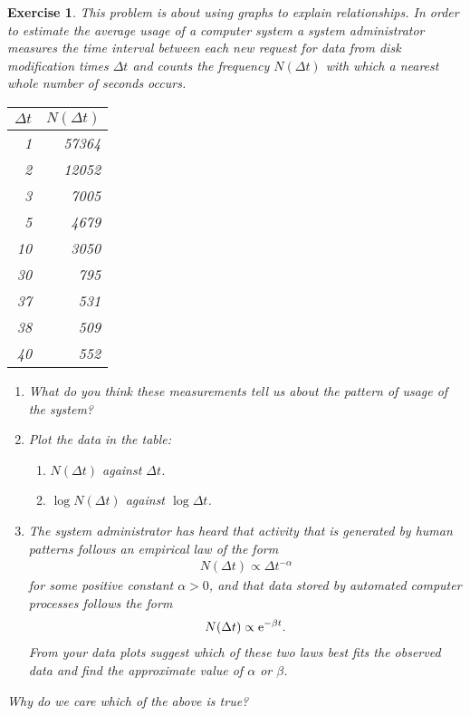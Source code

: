 \documentclass{book}
\newtheorem{exercise}{Exercise}
\def\beq{\begin{eqnarray}}
\def\eeq{\end{eqnarray}}
\def\e{{\rm e}}
\begin{document}
\begin{exercise}
This problem is about using graphs to explain relationships.
In order to estimate the average usage of a computer system a system
administrator measures the time interval between each new request for
data from disk modification times $\Delta t$ and counts the frequency
$N(\Delta t)$ with which a nearest whole number of seconds occurs.
\begin{center}
\begin{tabular}{r|r}
$\Delta t$ & $N(\Delta t)$\\
\hline
1  & 57364\\
2  & 12052\\
3  & 7005\\
5  & 4679\\
10 & 3050\\
30 & 795\\
37 & 531\\
38 & 509\\
40 & 552\\
\end{tabular}
\end{center} 
\begin{enumerate}
\item What do you think these measurements tell us about the
pattern of usage of the system?

\item Plot the data in the table:
\begin{enumerate}
\item $N(\Delta t)$ against $\Delta t$.
\item $\log N(\Delta t)$ against $\log \Delta t$.
\end{enumerate}

\item The system administrator has heard that activity that is
generated by human patterns follows an empirical law of the
form
\beq
N(\Delta t) \propto \Delta t^{-\alpha}
\eeq
for some positive constant $\alpha > 0$, and that data stored by
automated computer processes follows the form
\beq
N(\Delta t) \propto \e^{-\beta t}.
\eeq
From your data plots suggest which of these two laws best fits
the observed data and find the approximate value of $\alpha$ or $\beta$.
\end{enumerate}
Why do we care which of the above is true?
\end{exercise}
\begin{solution}
\end{solution}
\end{document}
